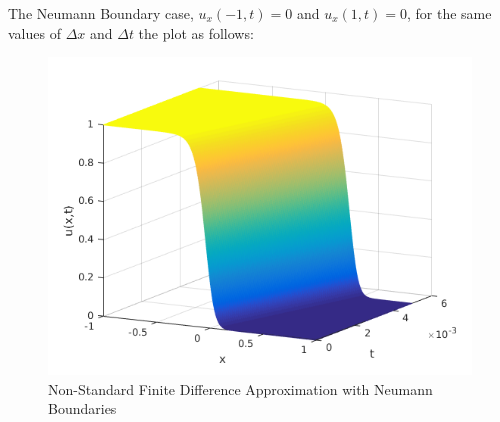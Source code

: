 \documentclass[a4paper]{article}
\begin{document}
	The Neumann Boundary case, $u_{x}(-1,t) = 0$ and $u_{x}(1,t) = 0$, for the same values of $\Delta x$ and $\Delta t$ the plot as follows:
    \begin{figure}[H]
    \caption{Non-Standard Finite Difference Approximation with Neumann Boundaries}
    \includegraphics[scale=0.7]{Fisher_Nuemann_NSFD.png}
    \end{figure}
	
\end{document}
